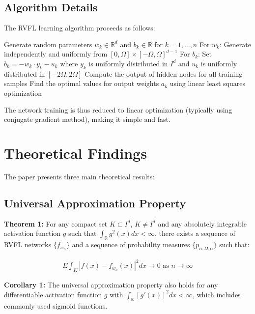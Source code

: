 \documentclass[11pt]{article}
\begin{document}
\subsection{Algorithm Details}

The RVFL learning algorithm proceeds as follows:

\begin{algorithm}
\caption{RVFL Learning Algorithm}
\begin{algorithmic}[1]
\State Generate random parameters $w_k \in \mathbb{R}^d$ and $b_k \in \mathbb{R}$ for $k = 1,\ldots,n$
\State For $w_k$: Generate independently and uniformly from $[0,\Omega] \times [-\Omega,\Omega]^{d-1}$
\State For $b_k$: Set $b_k = -w_k \cdot y_k - u_k$ where $y_k$ is uniformly distributed in $I^d$ and $u_k$ is uniformly distributed in $[-2\Omega,2\Omega]$
\State Compute the output of hidden nodes for all training samples
\State Find the optimal values for output weights $a_k$ using linear least squares optimization
\end{algorithmic}
\end{algorithm}

The network training is thus reduced to linear optimization (typically using conjugate gradient method), making it simple and fast.

\section{Theoretical Findings}

The paper presents three main theoretical results:

\subsection{Universal Approximation Property}

\textbf{Theorem 1:} For any compact set $K \subset I^d$, $K \neq I^d$ and any absolutely integrable activation function $g$ such that $\int_{\mathbb{R}} g^2(x) dx < \infty$, there exists a sequence of RVFL networks $\{f_{w_n}\}$ and a sequence of probability measures $\{p_{n,\Omega,\alpha}\}$ such that:

\begin{align}
E\int_K |f(x) - f_{w_n}(x)|^2 dx \rightarrow 0 \text{ as } n \rightarrow \infty
\end{align}

\textbf{Corollary 1:} The universal approximation property also holds for any differentiable activation function $g$ with $\int_{\mathbb{R}} [g'(x)]^2 dx < \infty$, which includes commonly used sigmoid functions.
\end{document}
